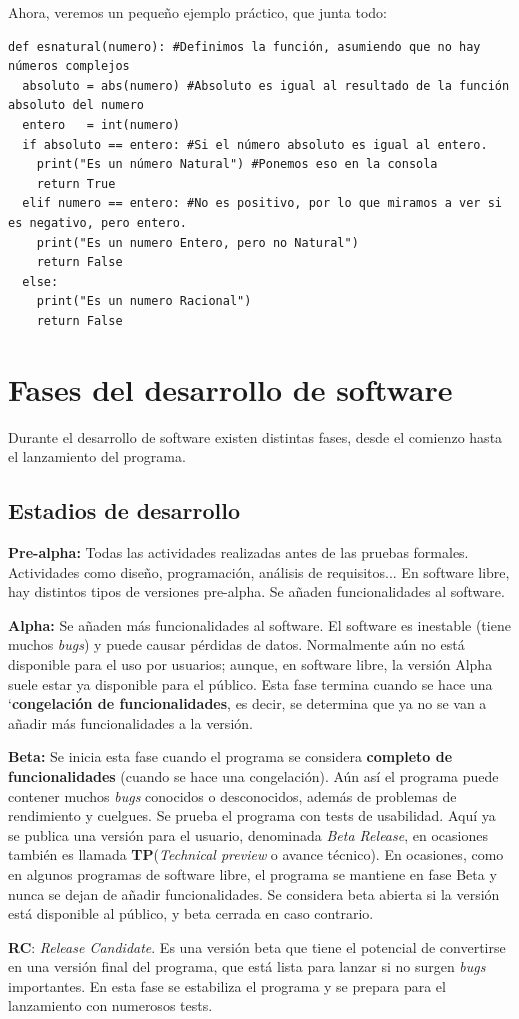 \documentclass[a4paper, 11pt]{report} %
\begin{document}
Ahora, veremos un pequeño ejemplo práctico, que junta todo:
\begin{verbatim}
def esnatural(numero): #Definimos la función, asumiendo que no hay números complejos
  absoluto = abs(numero) #Absoluto es igual al resultado de la función absoluto del numero
  entero   = int(numero) 
  if absoluto == entero: #Si el número absoluto es igual al entero.
    print("Es un número Natural") #Ponemos eso en la consola
    return True
  elif numero == entero: #No es positivo, por lo que miramos a ver si es negativo, pero entero.
    print("Es un numero Entero, pero no Natural")
    return False
  else:
    print("Es un numero Racional")
    return False
\end{verbatim}

\section{Fases del desarrollo de software}
Durante el desarrollo de software existen distintas fases, desde el comienzo hasta el lanzamiento del programa.
\subsection{Estadios de desarrollo}
\begin{description}
\item \textbf{Pre-alpha:} Todas las actividades realizadas antes de las pruebas formales. Actividades como diseño, programación, análisis de requisitos... En software libre, hay distintos tipos de versiones pre-alpha. Se añaden funcionalidades al software.
\item \textbf{Alpha:} Se añaden más funcionalidades al software. El software es inestable (tiene muchos \textit{bugs}) y puede causar pérdidas de datos. Normalmente aún no está disponible para el uso por usuarios; aunque, en software libre, la versión Alpha suele estar ya disponible para el público. Esta fase termina cuando se hace una `\textbf{congelación de funcionalidades}, es decir, se determina que ya no se van a añadir más funcionalidades a la versión.
\item \textbf{Beta:} Se inicia esta fase cuando el programa se considera \textbf{completo de funcionalidades} (cuando se hace una congelación). Aún así el programa puede contener muchos \textit{bugs} conocidos o desconocidos, además de problemas de rendimiento y cuelgues. Se prueba el programa con tests de usabilidad.
Aquí ya se publica una versión para el usuario, denominada \textit{Beta Release}, en ocasiones también es llamada \textbf{TP}(\textit{Technical preview} o avance técnico). En ocasiones, como en algunos programas de software libre, el programa se mantiene en fase Beta y nunca se dejan de añadir funcionalidades. Se considera beta abierta si la versión está disponible al público, y beta cerrada en caso contrario.
\item \textbf{RC}: \textit{Release Candidate}. Es una versión beta que tiene el potencial de convertirse en una versión final del programa, que está lista para lanzar si no surgen \textit{bugs} importantes. En esta fase se estabiliza el programa y se prepara para el lanzamiento con numerosos tests.
\end{description}
\end{document}
